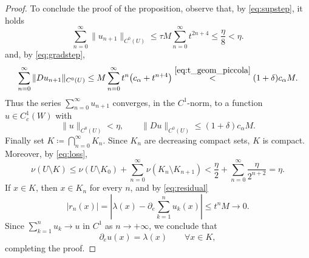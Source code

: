 \documentclass[10pt,a4paper]{amsart}
\begin{document}
\begin{proof}
To conclude the proof of the proposition, observe that, by \eqref{eq:supstep}, it holds
$$
\sum_{n=0}^\infty \|u_{n+1}\|_{C^0(U)}
\le \tau M \sum_{n=0}^\infty t^{2n+4}
\le \frac{\eta}{8}
< \eta.
$$
and, by \eqref{eq:gradstep},
$$
\sum_{n=0}^\infty \|Du_{n+1}\|_{C^0(U)}
\le M\sum_{n=0}^\infty t^{n}\bigl(c_\alpha+t^{n+4}\bigr)
\overset{\eqref{eq:t_geom_piccola}}{<} (1+\delta)c_\alpha M.
$$
Thus the series $\sum_{n=0}^\infty u_{n+1}$ converges, in the $C^1$-norm, to a function $u \in C^1_c(W)$ with
$$
\|u\|_{C^0(U)} < \eta,
\qquad
\|Du\|_{C^0(U)}\le (1+\delta)c_\alpha M.
$$
Finally set $K\coloneqq \bigcap_{n=0}^\infty K_n$.
Since $K_n$ are decreasing compact sets, $K$ is compact.
Moreover, by \eqref{eq:loss},
$$
\nu(U\setminus K)
\le \nu(U\setminus K_0)+\sum_{n=0}^\infty \nu(K_n\setminus K_{n+1})
< \frac{\eta}{2}+\sum_{n=0}^\infty \frac{\eta}{2^{n+2}}
=\eta.
$$
If $x\in K$, then $x\in K_n$ for every $n$, and by \eqref{eq:residual}
$$
|r_n(x)|=\left|\lambda(x)-\partial_e \sum_{k=1}^{n}u_k(x)\right|\le t^{n}M\to 0.
$$
Since $\sum_{k=1}^{n}u_k\to u$ in $C^1$ as $n \to +\infty$, we conclude that
$$
\partial_e u(x)=\lambda(x)
\qquad\forall x\in K,
$$
completing the proof.
\end{proof}
\end{document}
